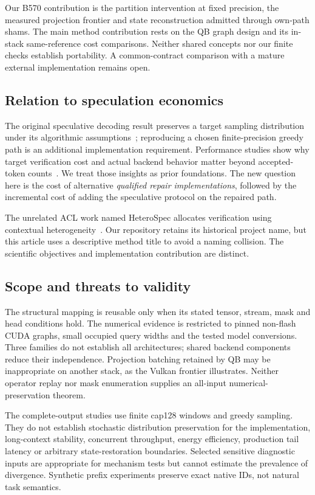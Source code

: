 Our B570 contribution is the partition intervention at fixed precision, the measured projection frontier and state reconstruction admitted through own-path shams. The main method contribution rests on the QB graph design and its in-stack same-reference cost comparisons. Neither shared concepts nor our finite checks establish portability. A common-contract comparison with a mature external implementation remains open.

\subsection{Relation to speculation economics}
The original speculative decoding result preserves a target sampling distribution under its algorithmic assumptions~\cite{leviathan2023}; reproducing a chosen finite-precision greedy path is an additional implementation requirement. Performance studies show why target verification cost and actual backend behavior matter beyond accepted-token counts~\cite{illusion,lossless}. We treat those insights as prior foundations. The new question here is the cost of alternative \emph{qualified repair implementations}, followed by the incremental cost of adding the speculative protocol on the repaired path.

The unrelated ACL work named HeteroSpec allocates verification using contextual heterogeneity~\cite{aclheterospec}. Our repository retains its historical project name, but this article uses a descriptive method title to avoid a naming collision. The scientific objectives and implementation contribution are distinct.

\subsection{Scope and threats to validity}
The structural mapping is reusable only when its stated tensor, stream, mask and head conditions hold. The numerical evidence is restricted to pinned non-flash CUDA graphs, small occupied query widths and the tested model conversions. Three families do not establish all architectures; shared backend components reduce their independence. Projection batching retained by QB may be inappropriate on another stack, as the Vulkan frontier illustrates. Neither operator replay nor mask enumeration supplies an all-input numerical-preservation theorem.

The complete-output studies use finite cap128 windows and greedy sampling. They do not establish stochastic distribution preservation for the implementation, long-context stability, concurrent throughput, energy efficiency, production tail latency or arbitrary state-restoration boundaries. Selected sensitive diagnostic inputs are appropriate for mechanism tests but cannot estimate the prevalence of divergence. Synthetic prefix experiments preserve exact native IDs, not natural task semantics.

